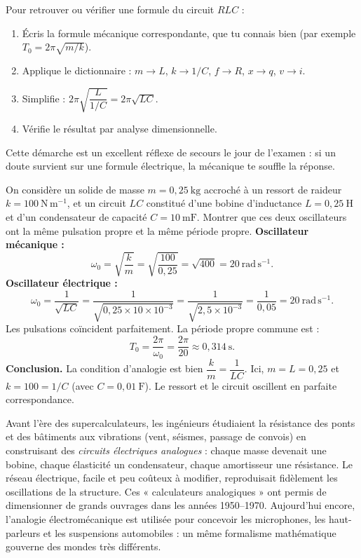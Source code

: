 \documentclass[11pt]{article}
\begin{document}
\begin{methode}
Pour retrouver ou vérifier une formule du circuit $RLC$ :
\begin{enumerate}
\item Écris la formule mécanique correspondante, que tu connais bien (par exemple $T_0 = 2\pi\sqrt{m/k}$).
\item Applique le dictionnaire : $m \to L$, \; $k \to 1/C$, \; $f \to R$, \; $x \to q$, \; $v \to i$.
\item Simplifie : $2\pi\sqrt{\dfrac{L}{1/C}} = 2\pi\sqrt{LC}$.
\item Vérifie le résultat par analyse dimensionnelle.
\end{enumerate}
Cette démarche est un excellent réflexe de secours le jour de l'examen : si un doute survient sur une formule électrique, la mécanique te souffle la réponse.
\end{methode}

\begin{exoresolu}
On considère un solide de masse $m = 0,25~\mathrm{kg}$ accroché à un ressort de raideur $k = 100~\mathrm{N\,m^{-1}}$, et un circuit $LC$ constitué d'une bobine d'inductance $L = 0,25~\mathrm{H}$ et d'un condensateur de capacité $C = 10~\mathrm{mF}$. Montrer que ces deux oscillateurs ont la même pulsation propre et la même période propre.
\tcblower
\textbf{Oscillateur mécanique :}
\[
\omega_0 = \sqrt{\frac{k}{m}} = \sqrt{\frac{100}{0,25}} = \sqrt{400} = 20~\mathrm{rad\,s^{-1}}.
\]
\textbf{Oscillateur électrique :}
\[
\omega_0 = \frac{1}{\sqrt{LC}} = \frac{1}{\sqrt{0,25 \times 10\times 10^{-3}}} = \frac{1}{\sqrt{2,5\times 10^{-3}}} = \frac{1}{0,05} = 20~\mathrm{rad\,s^{-1}}.
\]
Les pulsations coïncident parfaitement. La période propre commune est :
\[
T_0 = \frac{2\pi}{\omega_0} = \frac{2\pi}{20} \approx 0,314~\mathrm{s}.
\]
\textbf{Conclusion.} La condition d'analogie est bien $\dfrac{k}{m} = \dfrac{1}{LC}$. Ici, $m=L=0,25$ et $k=100 = 1/C$ (avec $C=0,01~\mathrm{F}$). Le ressort et le circuit oscillent en parfaite correspondance.
\end{exoresolu}

\begin{savaistu}
Avant l'ère des supercalculateurs, les ingénieurs étudiaient la résistance des ponts et des bâtiments aux vibrations (vent, séismes, passage de convois) en construisant des \emph{circuits électriques analogues} : chaque masse devenait une bobine, chaque élasticité un condensateur, chaque amortisseur une résistance. Le réseau électrique, facile et peu coûteux à modifier, reproduisait fidèlement les oscillations de la structure. Ces « calculateurs analogiques » ont permis de dimensionner de grands ouvrages dans les années 1950--1970. Aujourd'hui encore, l'analogie électromécanique est utilisée pour concevoir les microphones, les haut-parleurs et les suspensions automobiles : un même formalisme mathématique gouverne des mondes très différents.
\end{savaistu}
\end{document}
